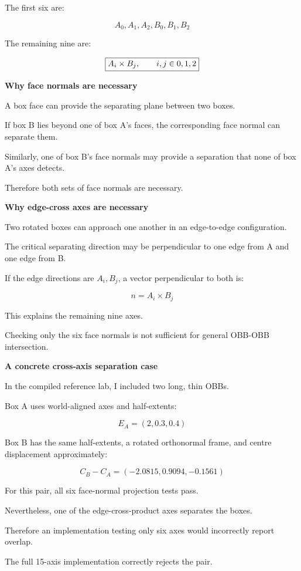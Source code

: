 The first six are:

\[
A_0,A_1,A_2,B_0,B_1,B_2
\]

The remaining nine are:

\[
\boxed{ A_i\times B_j,\qquad i,j\in\\{0,1,2\\} }
\]

\textbf{Why face normals are necessary}

A box face can provide the separating plane between two boxes.

If box B lies beyond one of box A's faces, the corresponding face normal can separate them.

Similarly, one of box B's face normals may provide a separation that none of box A's axes detects.

Therefore both sets of face normals are necessary.

\textbf{Why edge-cross axes are necessary}

Two rotated boxes can approach one another in an edge-to-edge configuration.

The critical separating direction may be perpendicular to one edge from A and one edge from B.

If the edge directions are \(A_i,B_j\), a vector perpendicular to both is:

\[
\boxed{ n=A_i\times B_j }
\]

This explains the remaining nine axes.

Checking only the six face normals is not sufficient for general OBB-OBB intersection.

\textbf{A concrete cross-axis separation case}

In the compiled reference lab, I included two long, thin OBBs.

Box A uses world-aligned axes and half-extents:

\[
E_A=(2,0.3,0.4)
\]

Box B has the same half-extents, a rotated orthonormal frame, and centre displacement approximately:

\[
C_B-C_A=(-2.0815,0.9094,-0.1561)
\]

For this pair, all six face-normal projection tests pass.

Nevertheless, one of the edge-cross-product axes separates the boxes.

Therefore an implementation testing only six axes would incorrectly report overlap.

The full 15-axis implementation correctly rejects the pair.

